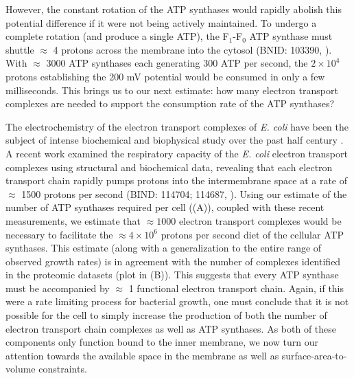 However, the constant rotation of the ATP synthases would rapidly abolish
this potential difference if it were not being actively maintained. To
undergo a complete rotation (and produce a single ATP), the F$_1$-F$_0$ ATP
synthase must shuttle $\approx$ 4 protons across the membrane into the
cytosol (BNID: 103390, \cite{milo2010}). With $\approx$ 3000 ATP synthases each
generating 300 ATP per second, the $2 \times 10^4$ protons establishing the 200
mV potential would be consumed in only a few milliseconds. This brings us
to our next estimate: how many electron transport complexes are needed to
support the consumption rate of the ATP synthases?

The electrochemistry of the electron transport complexes of \textit{E. coli}
have been the subject of intense biochemical and biophysical study over the past
half century \citep{ingledew1984, khademian2017,cox1970,henkel2014}. A recent
work \citep{szenk2017} examined the respiratory capacity of the \textit{E. coli}
electron transport complexes using structural and biochemical data, revealing
that each electron transport chain rapidly pumps protons into the intermembrane
space at a rate of $\approx$ 1500 protons per second (BIND: 114704; 114687,
\cite{milo2010}). Using our estimate of the number of ATP synthases required per
cell ((A)), coupled with these recent measurements, we
estimate that $\approx 1000$ electron transport complexes would be necessary to
facilitate the $\approx 4\times 10^6$ protons per second diet of the cellular
ATP synthases. This estimate (along with a generalization to the entire range of
observed growth rates) is in agreement with the number of complexes
identified in the proteomic datasets (plot in (B)). This
suggests that every ATP synthase must be accompanied by $\approx$ 1 functional
electron transport chain. Again, if this were a rate limiting process for
bacterial growth, one must conclude that it is not possible for the cell to
simply increase the production of both the number of electron transport chain
complexes as well as ATP synthases. As both of these components only function
bound to the inner membrane, we now turn our attention towards the available
space in the membrane as well as surface-area-to-volume constraints.


